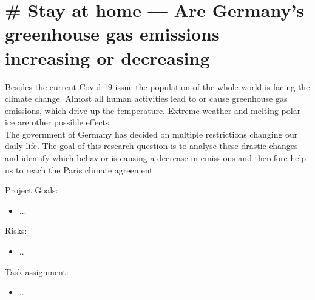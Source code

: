 \documentclass[a4paper,DIV=calc,11pt]{scrartcl}
\begin{document}
\section*{\# Stay at home --- Are Germany's greenhouse gas emissions increasing or decreasing}

Besides the current Covid-19 issue the population of the whole world is facing the climate change. Almost all human activities lead to or cause greenhouse gas emissions, which drive up the temperature. Extreme weather and melting polar ice are other possible effects.\\

The government of Germany has decided on multiple restrictions changing our daily life. The goal of this research question is to analyse these drastic changes and identify which behavior is causing a decrease in emissions and therefore help us to reach the Paris climate agreement.
\vspace{2cm}

Project Goals:
\begin{itemize}
    \item ...
\end{itemize}

Risks:
\begin{itemize}
    \item ..
\end{itemize}

Task assignment:
\begin{itemize}
    \item ..
\end{itemize}
\end{document}
